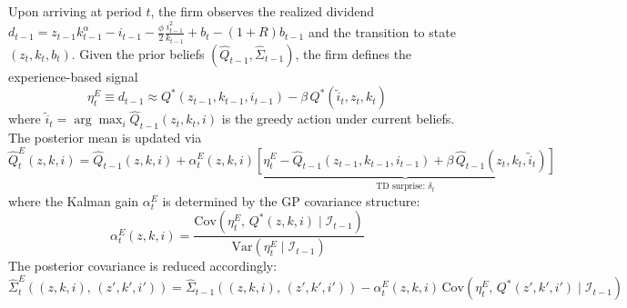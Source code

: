 \newpage

\begin{definition} \label{def:experience_learning_update}
    Upon arriving at period $t$, the firm observes the realized dividend 
    $d_{t-1} = z_{t-1} k_{t-1}^\alpha - i_{t-1} - \frac{\phi}{2}\frac{i_{t-1}^2}{k_{t-1}} 
    + b_t - (1+R)b_{t-1}$ and the transition to state $(z_t, k_t, b_t)$. 
    Given the prior beliefs $(\hat{Q}_{t-1}, \hat{\Sigma}_{t-1})$, the firm defines 
    the experience-based signal
    \begin{equation}
        \eta^E_t \equiv d_{t-1} \approx Q^*(z_{t-1}, k_{t-1}, i_{t-1}) 
        - \beta\, Q^*\!\left(\tilde{i}_t, z_t, k_t\right)
    \end{equation}
    where $\tilde{i}_t = \arg\max_{i} \hat{Q}_{t-1}(z_t, k_t, i)$ is the greedy 
    action under current beliefs. The posterior mean is updated via
    \begin{equation}
        \hat{Q}^E_t(z, k, i) = \hat{Q}_{t-1}(z, k, i) 
        + \alpha^E_t(z, k, i) 
        \underbrace{\left[\eta^E_t - \hat{Q}_{t-1}(z_{t-1}, k_{t-1}, i_{t-1}) 
        + \beta\, \hat{Q}_{t-1}(z_t, k_t, \tilde{i}_t)\right]}_{\text{TD surprise: } 
        \delta_t}
    \end{equation}
    where the Kalman gain $\alpha^E_t$ is determined by the GP covariance structure:
    \begin{equation}
        \alpha^E_t(z, k, i) = \frac{\mathrm{Cov}\!\left(\eta^E_t,\, 
        Q^*(z, k, i) \mid \mathcal{I}_{t-1}\right)}
        {\mathrm{Var}\!\left(\eta^E_t \mid \mathcal{I}_{t-1}\right)}
    \end{equation}
    The posterior covariance is reduced accordingly:
    \begin{equation}
        \hat{\Sigma}^E_t\!\left((z,k,i),\,(z',k',i')\right) = 
        \hat{\Sigma}_{t-1}\!\left((z,k,i),\,(z',k',i')\right) 
        - \alpha^E_t(z,k,i)\, 
        \mathrm{Cov}\!\left(\eta^E_t,\, Q^*(z',k',i') \mid \mathcal{I}_{t-1}\right)
    \end{equation}
\end{definition}


